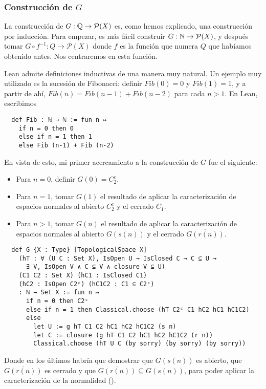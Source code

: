 \subsubsection{Construcción de $G$}

La construcción de $G : \mathbb{Q} \to \mathcal{P}(X)$ es, como hemos explicado, una construcción por inducción. Para empezar, es más fácil construir $G : \mathbb{N} \to \mathcal{P}(X)$, y después tomar $G \circ f^{-1} : Q \to \mathcal{P}(X)$ donde $f$ es la función que numera $Q$ que habíamos obtenido antes. Nos centraremos en esta función.

Lean admite definiciones inductivas de una manera muy natural. Un ejemplo muy utilizado es la sucesión de Fibonacci: definir $Fib(0) = 0$ y $Fib(1) = 1$, y a partir de ahí, $Fib(n) = Fib(n-1)+Fib(n-2)$ para cada $n > 1$. En Lean, escribimos

\begin{lstlisting}
  def Fib : ℕ → ℕ := fun n ↦
    if n = 0 then 0
    else if n = 1 then 1
    else Fib (n-1) + Fib (n-2)
\end{lstlisting}

En vista de esto, mi primer acercamiento a la construcción de $G$ fue el siguiente:

\begin{itemize}
  \item Para $n = 0$, definir $G(0) = C_2^c$.
  \item Para $n = 1$, tomar $G(1)$ el resultado de aplicar la caracterización de espacios normales al abierto $C_2^c$ y el cerrado $C_1$.
  \item Para $n >1$, tomar $G(n)$ el resultado de aplicar la caracterización de espacios normales al abierto $G(s(n))$ y el cerrado $\overline{G(r(n))}$.
\end{itemize}

\begin{lstlisting}
  def G {X : Type} [TopologicalSpace X]
    (hT : ∀ (U C : Set X), IsOpen U → IsClosed C → C ⊆ U →
      ∃ V, IsOpen V ∧ C ⊆ V ∧ closure V ⊆ U)
    (C1 C2 : Set X) (hC1 : IsClosed C1)
    (hC2 : IsOpen C2ᶜ) (hC1C2 : C1 ⊆ C2ᶜ)
    : ℕ → Set X := fun n ↦
      if n = 0 then C2ᶜ
      else if n = 1 then Classical.choose (hT C2ᶜ C1 hC2 hC1 hC1C2)
      else
        let U := g hT C1 C2 hC1 hC2 hC1C2 (s n)
        let C := closure (g hT C1 C2 hC1 hC2 hC1C2 (r n))
        Classical.choose (hT U C (by sorry) (by sorry) (by sorry))
\end{lstlisting}

Donde en los últimos  habría que demostrar que $G(s(n))$ es abierto, que $\overline{G(r(n))}$ es cerrado y que $\overline{G(r(n))} \subseteq G(s(n))$, para poder aplicar la caracterización de la normalidad ().

